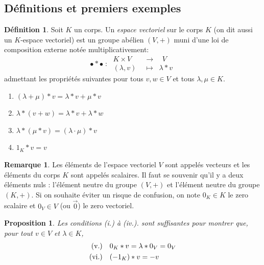 \documentclass[oneside,12pt,french,table]{book}
\newtheorem{prop}{Proposition}[section]
\theoremstyle{definition}
\theoremstyle{definition}
\theoremstyle{definition}
\newtheorem{definition}{Définition}[chapter]
\newtheorem*{remark}{Remarque}
\begin{document}
\subsection{Définitions et premiers  exemples}
    \begin{definition}
        Soit $K$ un corps. Un \textit{espace vectoriel} sur le corps $K$ (on dit aussi un $K$-espace vectoriel) est un groupe abélien $(V,+)$ muni d'une loi de composition externe notée multiplicativement:
        $$\bullet * \bullet \; : \; \begin{array}{rcl}
             K \times V &\longrightarrow& \; \, V  \\
             (\lambda, v) \; \; &\longmapsto& \lambda * v
        \end{array}
        $$
        admettant les propriétés suivantes pour tous $v, w \in V$ et tous $\lambda, \mu \in K$.
        \begin{center}
        \begin{minipage}{0.35\textwidth}
        \begin{enumerate}[(i.) \quad]
            \item $(\lambda+\mu) * v=\lambda * v+\mu * v$
            \item $\lambda * (v+w)=\lambda * v+\lambda * w$
            \item $\lambda * (\mu * v)=(\lambda \cdot \mu) * v$
            \item $1_K * v=v \quad$
        \end{enumerate}
        \end{minipage}
        \end{center}
    \end{definition}
    \begin{remark}
        Les éléments de l'espace vectoriel $V$ sont appelés vecteurs et les éléments du corps $K$ sont appelés scalaires. Il faut se souvenir qu'il y a deux éléments nuls : l'élément neutre du groupe $(V,+)$ et l'élément neutre du groupe $(K,+)$. Si on souhaite éviter un risque de confusion, on note $0_{K} \in K$ le zero scalaire et $0_{V} \in V$ (ou $\vec{0}$) le zero vectoriel.
    \end{remark}
    \begin{prop}
    Les conditions \textnormal{(i.)} à \textnormal{(iv.)}. sont suffisantes pour montrer que, pour tout $v \in V$ et $\lambda \in K$, 
    \begin{align*}
    \textnormal{(v.)}& \quad 0_K * v = \lambda * 0_V = 0_V   \\
    \textnormal{(vi.)}& \quad (-1_K) * v = -v
    \end{align*}
    \end{prop}
\end{document}
